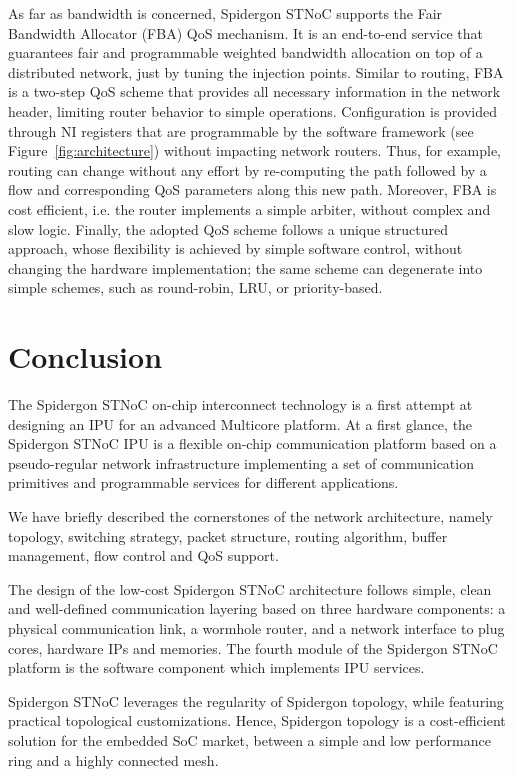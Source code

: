 As far as bandwidth is concerned, Spidergon STNoC supports the Fair Bandwidth Allocator (FBA) QoS mechanism. 
It is an end-to-end service that guarantees fair and programmable weighted bandwidth allocation on top of a distributed network, just by tuning the injection points. 
Similar to routing, FBA is a two-step QoS scheme that provides all necessary information in the network header, limiting router behavior to simple operations. 
Configuration is provided through NI registers that are programmable by the software framework (see Figure~\ref{fig:architecture}) without impacting network routers. 
Thus, for example, routing can change without any effort by re-computing the path followed by a flow and corresponding QoS parameters along this new path. 
Moreover, FBA is cost efficient, i.e. the router implements a simple arbiter, without complex and slow logic. 
Finally, the adopted QoS scheme follows a unique structured approach, whose flexibility is achieved by simple software control, without changing the hardware implementation; the same scheme can degenerate into simple schemes, such as round-robin, LRU, or priority-based.

\section{Conclusion}\label{S:conclusion}

The Spidergon STNoC on-chip interconnect technology is a first attempt at designing an IPU for an advanced Multicore platform. 
At a first glance, the Spidergon STNoC IPU is a flexible on-chip communication platform based on a pseudo-regular network infrastructure implementing a set of communication primitives and programmable services for different applications.

We have briefly described the cornerstones of the network architecture, namely topology, switching strategy, packet structure, routing algorithm, buffer management, flow control and QoS support. 

The design of the low-cost Spidergon STNoC architecture follows simple, clean and well-defined communication layering based on three hardware components: a physical communication link, a wormhole router, and a network interface to plug cores, hardware IPs and memories. 
The fourth module of the Spidergon STNoC platform is the software component which implements IPU services.

Spidergon STNoC leverages the regularity of Spidergon topology, while featuring practical topological customizations. 
Hence, Spidergon topology is a cost-efficient solution for the embedded SoC market, between a simple and low performance ring and a highly connected mesh.







